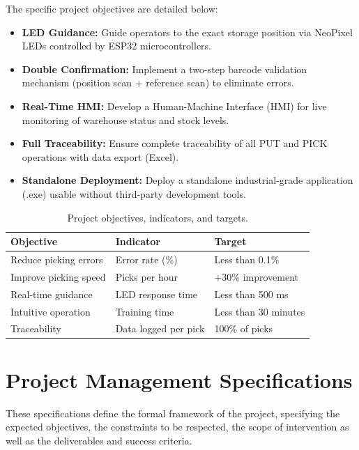 The specific project objectives are detailed below:

\begin{itemize}
  \item \textbf{LED Guidance:} Guide operators to the exact storage position via NeoPixel LEDs controlled by ESP32 microcontrollers.
  \item \textbf{Double Confirmation:} Implement a two-step barcode validation mechanism (position scan + reference scan) to eliminate errors.
  \item \textbf{Real-Time HMI:} Develop a Human-Machine Interface (HMI) for live monitoring of warehouse status and stock levels.
  \item \textbf{Full Traceability:} Ensure complete traceability of all PUT and PICK operations with data export (Excel).
  \item \textbf{Standalone Deployment:} Deploy a standalone industrial-grade application (.exe) usable without third-party development tools.
\end{itemize}

\begin{table}[H]
  \centering
  \caption{Project objectives, indicators, and targets.}
  \label{tab:objectives}
  \begin{tabular}{p{4cm} p{5cm} p{4cm}}
    \toprule
    \textbf{Objective} & \textbf{Indicator} & \textbf{Target} \\
    \midrule
    Reduce picking errors & Error rate (\%) & Less than 0.1\% \\
    Improve picking speed & Picks per hour & +30\% improvement \\
    Real-time guidance & LED response time & Less than 500 ms \\
    Intuitive operation & Training time & Less than 30 minutes \\
    Traceability & Data logged per pick & 100\% of picks \\
    \bottomrule
  \end{tabular}
\end{table}

\section{Project Management Specifications}
\label{sec:specifications}

These specifications define the formal framework of the project, specifying the expected objectives, the constraints to be respected, the scope of intervention as well as the deliverables and success criteria.

